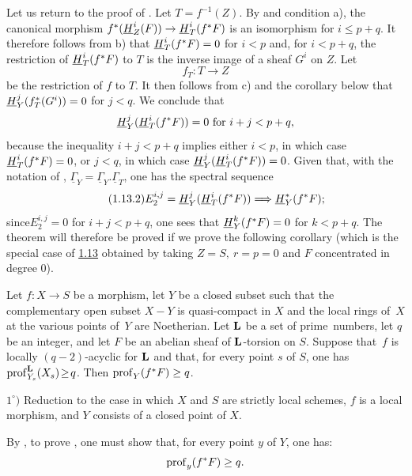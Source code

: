 Let us return to the proof of . Let $T=f^{-1}(Z)$. By  and condition a), the canonical morphism $f^*(\mathop{\underline{H}}\nolimits_Z^i(F))\to\mathop{\underline{H}}\nolimits_T^i(f^*F)$ is an isomorphism for $i\leq p+q$. It therefore follows from b) that $\mathop{\underline{H}}\nolimits^i_T(f^*F)=0$ for $i<p$ and, for $i<p+q$, the restriction of $\mathop{\underline{H}}\nolimits^i_T(f^*F)$ to $T$ is the inverse image of a sheaf $G^i$ on $Z$. Let
$$f_T:T\to Z$$
be the restriction of $f$ to $T$. It then follows from c) and the corollary below that $\mathop{\underline{H}}\nolimits^j_Y(f^*_T(G^i))=0$ for $j<q$. We conclude that
$$
\mathop{\underline{H}}\nolimits^j_Y(\mathop{\underline{H}}\nolimits^i_T(f^*F))=0\text{ for } i+j<p+q,
$$
because the inequality $i+j<p+q$ implies either $i<p$, in which case $\mathop{\underline{H}}\nolimits^i_T(f^*F)=0$, or $j<q$, in which case $\mathop{\underline{H}}\nolimits_Y^j(\mathop{\underline{H}}\nolimits_T^i(f^*F))=0$. Given that, with the notation of , $\underline{\Gamma}_Y=\underline{\Gamma}_Y.\underline{\Gamma}_T$, one has the spectral sequence
\begin{equation*} \label{eq:XIV.1.13.2} \tag{1.13.2}
E_2^{i, j}=\mathop{\underline{H}}\nolimits_Y^j(\mathop{\underline{H}}\nolimits_T^i(f^*F))\Longrightarrow\mathop{\underline{H}}\nolimits^*_Y(f^*F);
\end{equation*}
since\pageoriginale $E_2^{i, j}=0$ for $i+j<p+q$, one sees that $\mathop{\underline{H}}\nolimits_Y^k(f^*F)=0$ for $k<p+q$. The theorem will therefore be proved if we prove the following corollary (which is the special case of \hyperref[XIV.1.13]{1.13} obtained by taking $Z=S, \ r=p=0$ and $F$ concentrated in degree $0$).

\begin{corollaire}\label{XIV.1.14}
Let $f:X\to S$ be a morphism, let $Y$ be a closed subset such that the complementary open subset $X-Y$ is quasi-compact in $X$ and the local rings of~$X$ at the various points of~$Y$ are Noetherian. Let $\mathbf L$ be a set of \hbox{prime numbers}, let $q$ be an integer, and let $F$ be an abelian sheaf of $\mathbf L$-torsion on $S$. Suppose that~$f$ is locally $(q-2)$-acyclic for $\mathbf L$ and that, for every point $s$ of $S$, one has \hbox{$\operatorname{prof}_{Y_s}^\mathbf L(X_s)\!\geq\! q$}. Then $\operatorname{prof}_Y(f^*F)\geq q$.
\end{corollaire}

$1^\circ)$ Reduction to the case in which $X$ and $S$ are strictly local schemes, $f$ is a local morphism, and $Y$ consists of a closed point of $X$.

By , to prove , one must show that, for every point $y$ of $Y$, one has:$$
\operatorname{prof}_y(f^*F)\geq q.
$$

